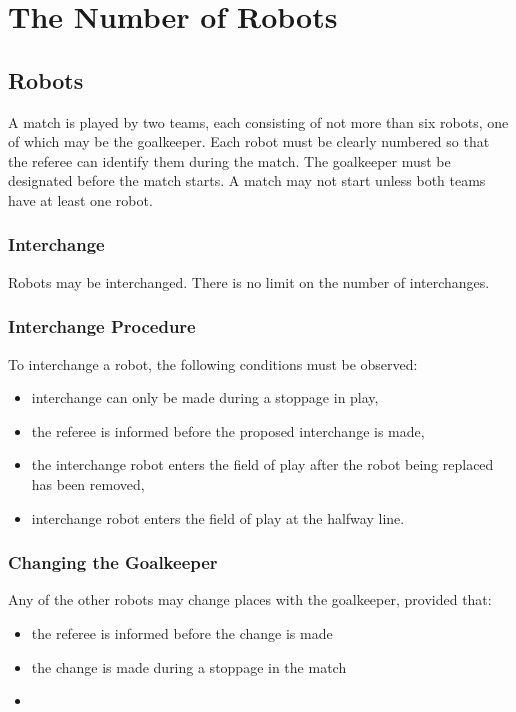 \section{The Number of Robots}\label{sec:number-of-robots}

\subsection{Robots}
A match is played by two teams, each consisting of not more than six robots, one of which may be the goalkeeper.
Each robot must be clearly numbered so that the referee can identify them during the match.
The goalkeeper must be designated before the match starts.
A match may not start unless both teams have at least one robot.

\subsubsection{Interchange}\label{subsubsec:number-of-robots-interchange}
Robots may be interchanged.
There is no limit on the number of interchanges.

\subsubsection{Interchange Procedure}
To interchange a robot, the following conditions must be observed:
\begin{itemize}
\item interchange can only be made during a stoppage in play,
\item the referee is informed before the proposed interchange is made,
\item the interchange robot enters the field of play after the robot being replaced has been removed,
\item {} interchange robot enters the field of play at the halfway line.
\end{itemize}

\subsubsection{Changing the Goalkeeper}
Any of the other robots may change places with the goalkeeper, provided that:
\begin{itemize}
\item the referee is informed before the change is made 
\item the change is made during a stoppage in the match
\item {}
\end{itemize}


